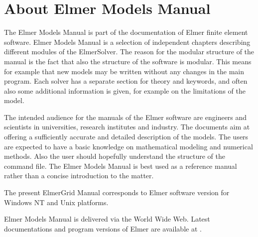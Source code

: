 \chapter*{About Elmer Models Manual}

The Elmer Models Manual is part of the documentation of 
Elmer finite element software.
Elmer Models Manual is a selection of independent 
chapters describing different modules of the ElmerSolver. 
The reason for the modular structure of the manual 
is the fact that also
the structure of the software is modular. This
means for example that new models may be written
without any changes in the main program.  
Each solver has a separate section for theory and 
keywords, and often also some additional information 
is given, for example on the limitations of the model.

The intended audience for the manuals of the Elmer software 
are engineers and
scientists in universities, research institutes and industry. The documents
aim at offering a sufficiently accurate and detailed description of 
the models. The users are expected to have a 
basic knowledge on mathematical modeling and numerical methods. 
Also the user should hopefully understand the structure of the command file.
The Elmer Models Manual is best used as a reference manual 
rather than a concise introduction to the matter. 

The present ElmerGrid Manual
corresponds to Elmer software version \elmerversion{} for 
Windows NT and Unix platforms. 

Elmer Models Manual is delivered via the World Wide Web.
Latest documentations and program versions of Elmer are available at 
. 


